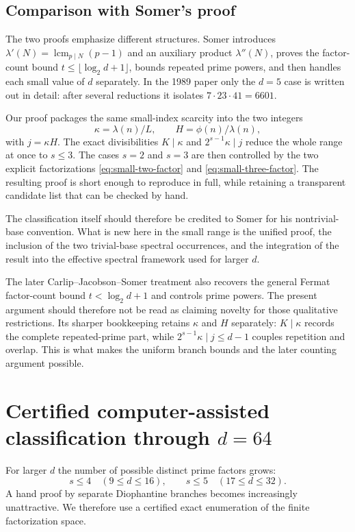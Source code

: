 \documentclass[11pt]{article}
\begin{document}
\subsection{Comparison with Somer's proof}

The two proofs emphasize different structures.  Somer introduces
$\lambda'(N)=\operatorname{lcm}_{p\mid N}(p-1)$ and an auxiliary product
$\lambda''(N)$, proves the factor-count bound
$t\le\lfloor\log_2 d+1\rfloor$, bounds repeated prime powers, and then
handles each small value of $d$ separately.  In the 1989 paper only the
$d=5$ case is written out in detail: after several reductions it isolates
$7\cdot23\cdot41=6601$.

Our proof packages the same small-index scarcity into the two integers
\[
\kappa=\lambda(n)/L,
\qquad
H=\phi(n)/\lambda(n),
\]
with $j=\kappa H$.  The exact divisibilities $K\mid \kappa$ and
$2^{s-1}\kappa\mid j$ reduce the whole range at once to $s\le3$.  The cases
$s=2$ and $s=3$ are then controlled by the two explicit factorizations
\eqref{eq:small-two-factor} and \eqref{eq:small-three-factor}.  The resulting
proof is short enough to reproduce in full, while retaining a transparent
candidate list that can be checked by hand.

The classification itself should therefore be credited to Somer for his
nontrivial-base convention.  What is new here in the small range is the
unified proof, the inclusion of the two trivial-base spectral occurrences,
and the integration of the result into the effective spectral framework used
for larger $d$.

The later Carlip--Jacobson--Somer treatment \cite{CarlipJacobsonSomer1998}
also recovers the general Fermat factor-count bound $t<\log_2d+1$ and controls
prime powers.  The present argument should therefore not be read as claiming
novelty for those qualitative restrictions.  Its sharper bookkeeping retains
$\kappa$ and $H$ separately: $K\mid\kappa$ records the complete repeated-prime
part, while $2^{s-1}\kappa\mid j\le d-1$ couples repetition and overlap.  This
is what makes the uniform branch bounds and the later counting argument
possible.

\section{Certified computer-assisted classification through $d=64$}
\label{sec:certified-search}
\label{sec:computer-assisted}

For larger $d$ the number of possible distinct prime factors grows:
\[
s\le4\quad(9\le d\le16),
\qquad
s\le5\quad(17\le d\le32).
\]
A hand proof by separate Diophantine branches becomes increasingly
unattractive.  We therefore use a certified exact enumeration of the
finite factorization space.
\end{document}
